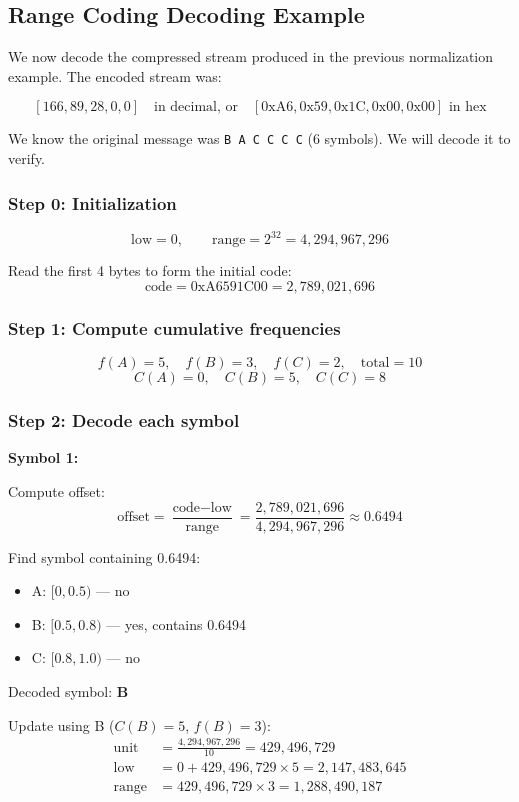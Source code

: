 \documentclass[12pt]{article}
\begin{document}
\subsection{Range Coding Decoding Example}

We now decode the compressed stream produced in the previous normalization example. The encoded stream was:

\[
[166, 89, 28, 0, 0] \quad \text{in decimal, or} \quad [\text{0xA6}, \text{0x59}, \text{0x1C}, \text{0x00}, \text{0x00}] \text{ in hex}
\]

We know the original message was \texttt{B A C C C C} (6 symbols). We will decode it to verify.

\subsubsection*{Step 0: Initialization}
\[
\text{low} = 0,\qquad \text{range} = 2^{32} = 4{,}294{,}967{,}296
\]

Read the first 4 bytes to form the initial code:
\[
\text{code} = 0\text{xA6591C00} = 2{,}789{,}021{,}696
\]

\subsubsection*{Step 1: Compute cumulative frequencies}
\[
f(A)=5,\quad f(B)=3,\quad f(C)=2,\quad \text{total}=10
\]
\[
C(A)=0,\quad C(B)=5,\quad C(C)=8
\]

\subsubsection*{Step 2: Decode each symbol}

\textbf{Symbol 1:}

Compute offset:
\[
\text{offset} = \frac{\text{code} - \text{low}}{\text{range}} = \frac{2{,}789{,}021{,}696}{4{,}294{,}967{,}296} \approx 0.6494
\]

Find symbol containing 0.6494:
\begin{itemize}
    \item A: $[0, 0.5)$ — no
    \item B: $[0.5, 0.8)$ — yes, contains 0.6494
    \item C: $[0.8, 1.0)$ — no
\end{itemize}

Decoded symbol: \textbf{B}

Update using B ($C(B)=5$, $f(B)=3$):
\begin{align*}
\text{unit} &= \frac{4{,}294{,}967{,}296}{10} = 429{,}496{,}729 \\
\text{low} &= 0 + 429{,}496{,}729 \times 5 = 2{,}147{,}483{,}645 \\
\text{range} &= 429{,}496{,}729 \times 3 = 1{,}288{,}490{,}187
\end{align*}
\end{document}

